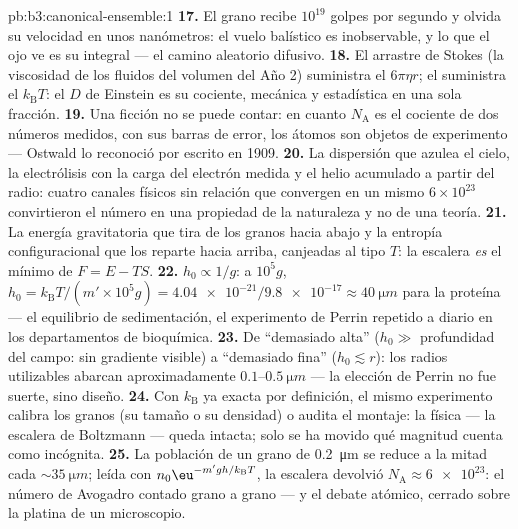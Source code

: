 \begin{solution}{pb:b3:canonical-ensemble:1}
\textbf{17.} El grano recibe $10^{19}$ golpes por segundo y
olvida su velocidad en unos nanómetros: el vuelo balístico es
inobservable, y lo que el ojo ve es su integral --- el
camino aleatorio difusivo.
\textbf{18.} El arrastre de Stokes (la viscosidad de los fluidos del
volumen del Año 2) suministra el $6\pi\eta r$; el 
suministra el $k_{\text{B}}T$: el $D$ de Einstein es su cociente, mecánica
y estadística en una sola fracción.
\textbf{19.} Una ficción no se puede contar: en cuanto $N_{\text{A}}$ es
el cociente de dos números medidos, con sus barras de error, los átomos son
objetos de experimento --- Ostwald lo reconoció por escrito en 1909.
\textbf{20.} La dispersión que azulea el cielo, la electrólisis con la
carga del electrón medida y el helio acumulado a partir del radio: cuatro
canales físicos sin relación que convergen en un mismo $6\times10^{23}$
convirtieron el número en una propiedad de la naturaleza y no de una teoría.
\textbf{21.} La energía gravitatoria que tira de los granos hacia abajo y
la entropía configuracional que los reparte hacia arriba, canjeadas al tipo
$T$: la escalera \emph{es} el mínimo de $F = E - TS$.
\textbf{22.} $h_0 \propto 1/g$: a $10^5g$,
$h_0 = k_{\text{B}}T/(m'\times10^5g) = \num{4.04e-21}/
\num{9.8e-17} \approx \qty{40}{\micro m}$ para la proteína ---
el equilibrio de sedimentación, el experimento de Perrin repetido a diario
en los departamentos de bioquímica.
\textbf{23.} De ``demasiado alta'' ($h_0 \gg$ profundidad del campo: sin
gradiente visible) a ``demasiado fina'' ($h_0 \lesssim r$): los radios
utilizables abarcan aproximadamente $0.1$--$\qty{0.5}{\micro m}$ --- la
elección de Perrin no fue suerte, sino diseño.
\textbf{24.} Con $k_{\text{B}}$ ya exacta por definición, el
mismo experimento calibra los granos (su tamaño o su densidad) o
audita el montaje: la física --- la escalera de Boltzmann --- queda
intacta; solo se ha movido qué magnitud cuenta como incógnita.
\textbf{25.} La población de un grano de \qty{0.2}{\micro m} se reduce a la
mitad cada $\sim\qty{35}{\micro m}$; leída con $n_0\eu^{-m'gh/k_{\text{B}}
T}$, la escalera devolvió $N_{\text{A}} \approx \num{6e23}$:
el número de Avogadro contado grano a grano --- y el debate atómico,
cerrado sobre la platina de un microscopio.
\end{solution}

